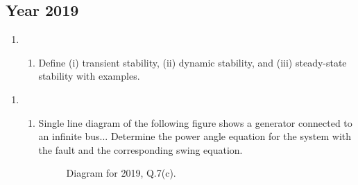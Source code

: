 \documentclass[12pt, a4paper]{article}
\begin{document}
	\subsection{Year 2019}
	\begin{enumerate}[label=\textbf{Q.6}, wide, labelindent=0pt]
		\item 
		\begin{enumerate}[label=\textbf{(\alph*)}]
			\item Define (i) transient stability, (ii) dynamic stability, and (iii) steady-state stability with examples.
		\end{enumerate}
	\end{enumerate}
	\begin{enumerate}[label=\textbf{Q.7}, wide, labelindent=0pt, start=7]
		\item 
		\begin{enumerate}[label=\textbf{(\alph*)}]
			\item Single line diagram of the following figure shows a generator connected to an infinite bus... Determine the power angle equation for the system with the fault and the corresponding swing equation.
			\begin{figure}[h!]
				\centering
				\caption{Diagram for 2019, Q.7(c).}
			\end{figure}
		\end{enumerate}
	\end{enumerate}
	
	
\end{document}
